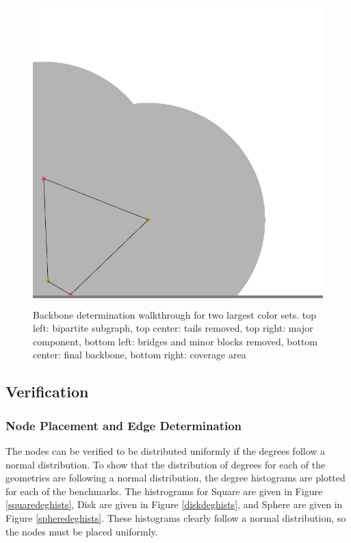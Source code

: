 \documentclass{article}
\begin{document}
\begin{figure}
\begin{minipage}{0.3\textwidth}
            \end{minipage}
            \hspace{\fill}
            \begin{minipage}{0.3\textwidth}
            \colorbox{gray}{\includegraphics[width=\linewidth]{./images/backbone-coverage-wt.png}}
            \end{minipage}

            \caption{Backbone determination walkthrough for two largest color sets. top left: bipartite subgraph, top center: tails removed, top right: major component, bottom left: bridges and minor blocks removed, bottom center: final backbone, bottom right: coverage area}
            \label{wtbackbone}
        \end{figure}

    \subsection{Verification}

        \subsubsection{Node Placement and Edge Determination}
        The nodes can be verified to be distributed uniformly if the degrees follow a normal distribution. To show that the distribution of degrees for each of the geometries are following a normal distribution, the degree histograms are plotted for each of the benchmarks. The histrograms for Square are given in Figure \ref{squaredeghists}, Disk are given in Figure \ref{diskdeghists}, and Sphere are given in Figure \ref{spheredeghists}. These histograms clearly follow a normal distribution, so the nodes must be placed uniformly.
\end{document}
